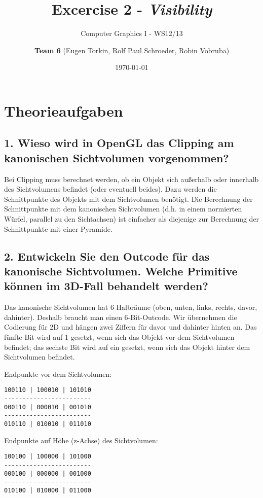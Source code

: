 \documentclass[a4paper,headings=small]{scrartcl}
\title{Excercise 2 - \emph{Visibility}}
\subtitle{Computer Graphics I - WS12/13}
\author{\textbf{Team 6} (Eugen Torkin, Rolf Paul Schroeder, Robin Vobruba)}
\date{\today}
\numberwithin{equation}{section} %
\numberwithin{figure}{section}   %
\begin{document}
\maketitle


\section{Theorieaufgaben}

\subsection{1. Wieso wird in OpenGL das Clipping am kanonischen Sichtvolumen vorgenommen?}

Bei Clipping muss berechnet werden, ob ein Objekt sich außerhalb oder innerhalb des Sichtvolumens befindet (oder eventuell beides). Dazu werden die Schnittpunkte des Objekts mit dem Sichtvolumen benötigt. Die Berechnung der Schnittpunkte mit dem kanonischen Sichtvolumen (d.h. in einem normierten Würfel, parallel zu den Sichtachsen) ist einfacher als diejenige zur Berechnung der Schnittpunkte mit einer Pyramide.

\subsection{2. Entwickeln Sie den Outcode für das kanonische Sichtvolumen. Welche Primitive können im 3D-Fall
behandelt werden?
}

Das kanonische Sichtvolumen hat 6 Halbräume (oben, unten, links, rechts, davor, dahinter). Deshalb braucht man einen 6-Bit-Outcode. Wir übernehmen die Codierung für 2D und hängen zwei Ziffern für davor und dahinter hinten an. Das fünfte Bit wird auf 1 gesetzt, wenn sich das Objekt vor dem Sichtvolumen befindet; das sechste Bit wird auf ein gesetzt, wenn sich das Objekt hinter dem Sichtvolumen befindet.

Endpunkte vor dem Sichtvolumen:
\begin{verbatim}
100110 | 100010 | 101010
------------------------
000110 | 000010 | 001010
------------------------
010110 | 010010 | 011010
\end{verbatim}

Endpunkte auf Höhe (z-Achse) des Sichtvolumen:
\begin{verbatim}
100100 | 100000 | 101000
------------------------
000100 | 000000 | 001000
------------------------
010100 | 010000 | 011000
\end{verbatim}
\end{document}
